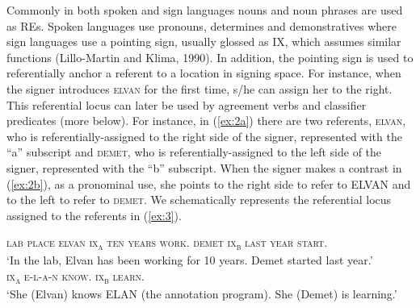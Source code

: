 \documentclass[]{elsarticle} %
\begin{document}
Commonly in both spoken and sign languages nouns and noun phrases are
used as REs. Spoken languages use pronouns, determines and
demonstratives where sign languages use a pointing sign, usually glossed
as IX, which assumes similar functions (Lillo-Martin and Klima, 1990).
In addition, the pointing sign is used to referentially anchor a
referent to a location in signing space. For instance, when the signer
introduces \textsc{elvan} for the first time, s/he can assign her to the
right. This referential locus can later be used by agreement verbs and
classifier predicates (more below). For instance, in (\ref{ex:2a}) there
are two referents, \textsc{elvan}, who is referentially-assigned to the
right side of the signer, represented with the ``a'' subscript and
\textsc{demet}, who is referentially-assigned to the left side of the
signer, represented with the ``b'' subscript. When the signer makes a
contrast in (\ref{ex:2b}), as a pronominal use, she points to the right
side to refer to ELVAN and to the left to refer to \textsc{demet}. We
schematically represents the referential locus assigned to the referents
in (\ref{ex:3}).

\begin{exe}
    \ex 
\begin{xlist}
    \ex \label{ex:2a}
    \textsc{lab place elvan ix\textsubscript{a} ten years work. demet ix\textsubscript{b} last year start.} \\
    ‘In the lab, Elvan has been working for 10 years. Demet started last year.’
    \\
    \ex \label{ex:2b}
    \textsc{ix\textsubscript{a} e-l-a-n know. ix\textsubscript{b} learn.}\\
    ‘She (Elvan) knows ELAN (the annotation program). She (Demet) is learning.’
    \end{xlist}
    \end{exe}
\end{document}

